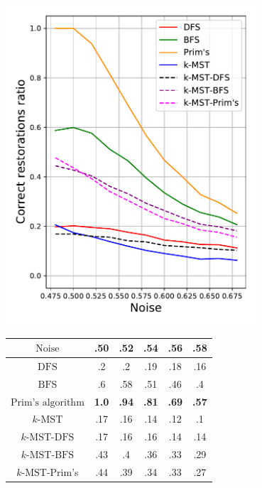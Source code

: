\documentclass[11pt, tightenlines, twoside, onecolumn, nofloats, nobibnotes, nofootinbib, superscriptaddress, noshowpacks, centertags]{revtex4}
\begin{document}
\begin{minipage}[B]{0.49\textwidth}
    \centering
    \includegraphics[width=0.7\textwidth]{img/main_algs_local_alpha000_maxarity_5_20.pdf}
    \label{ris:main_algs_local}
\end{minipage}
\hfill
\begin{minipage}[B]{0.49\textwidth}
        \centering
        \begin{tabular}{|c||c|c|c|c|c|}
            \hline
            $\text{Noise}$      &.50&.52&.54&.56&.58\\
            \hline
            \hline
            $\text{DFS}$                &.2  &.2 &.19 &.18 &.16\\
            \hline
            $\text{BFS}$                &.6  &.58 &.51 &.46 &.4\\
            \hline
            $\text{Prim's algorithm}$       &\textbf{1.0}  &\textbf{.94}&\textbf{.81}&\textbf{.69}&\textbf{.57}\\
            \hline
            $k\text{-MST}$          &.17  &.16 &.14 &.12 &.1\\
            \hline
            $k\text{-MST}$-$\text{DFS}$     &.17  &.16 &.16 &.14 &.14 \\
            \hline
            $k\text{-MST}$-$\text{BFS}$     &.43  &.4 &.36 &.33 &.29 \\
            \hline
            $k\text{-MST}$-Prim's   &.44  &.39 &.34 &.33 &.27 \\
            \hline
        \end{tabular}
        \label{table:main_algs_local}
\end{minipage}
\end{document}
